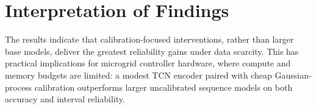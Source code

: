 \section{Interpretation of Findings}
The results indicate that calibration-focused interventions, rather than larger base models,
deliver the greatest reliability gains under data scarcity. This has practical implications
for microgrid controller hardware, where compute and memory budgets are limited: a modest
TCN encoder paired with cheap Gaussian-process calibration outperforms larger uncalibrated
sequence models on both accuracy and interval reliability.
